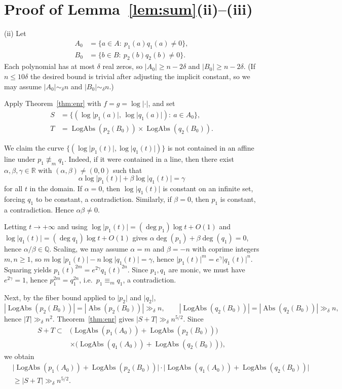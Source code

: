 \documentclass[12pt,reqno]{amsart}
\numberwithin{equation}{section}
\newcommand{\abs}[1]{\lvert#1\rvert}
\DeclareMathOperator{\Absset}{Abs}
\DeclareMathOperator{\LogAbsset}{LogAbs}
\begin{document}
\appendix
\section{Proof of Lemma~\ref{lem:sum}(ii)--(iii)}\label{app:sumproof}

\medskip
\noindent (ii)
Let
\[
\begin{aligned}
A_0&=\{a\in A:\ p_1(a)q_1(a)\neq 0\},\\
B_0&=\{b\in B:\ p_2(b)q_2(b)\neq 0\}.
\end{aligned}
\]
Each polynomial has at most $\delta$ real zeros, so $|A_0|\ge n-2\delta$ and $|B_0|\ge n-2\delta$.
(If $n\le 10\delta$ the desired bound is trivial after adjusting the implicit constant,
so we may assume $|A_0|\sim_\delta n$ and $|B_0|\sim_\delta n$.)

Apply Theorem~\ref{thm:enr} with $f=g=\log\abs{\cdot}$, and set
\[
\begin{aligned}
S&=\{(\log\abs{p_1(a)},\,\log\abs{q_1(a)}):\ a\in A_0\},\\
T&=\LogAbsset(p_2(B_0))\times \LogAbsset(q_2(B_0)).
\end{aligned}
\]

We claim the curve $\{(\log\abs{p_1(t)},\log\abs{q_1(t)})\}$ is not contained in an affine line
under $p_1\not\equiv_m q_1$.
Indeed, if it were contained in a line, then there exist $\alpha,\beta,\gamma\in\mathbb R$ with
$(\alpha,\beta)\neq(0,0)$ such that
\[
\alpha\log\abs{p_1(t)}+\beta\log\abs{q_1(t)}=\gamma
\]
for all $t$ in the domain.
If $\alpha=0$, then $\log\abs{q_1(t)}$ is constant on an infinite set, forcing $q_1$ to be constant,
a contradiction. Similarly, if $\beta=0$, then $p_1$ is constant, a contradiction. Hence $\alpha\beta\neq 0$.

Letting $t\to+\infty$ and using
$\log\abs{p_1(t)}=(\deg p_1)\log t+O(1)$ and
$\log\abs{q_1(t)}=(\deg q_1)\log t+O(1)$ gives
$\alpha\deg(p_1)+\beta\deg(q_1)=0$, hence $\alpha/\beta\in\mathbb Q$.
Scaling, we may assume $\alpha=m$ and $\beta=-n$ with coprime integers $m,n\ge 1$, so
$m\log\abs{p_1(t)}-n\log\abs{q_1(t)}=\gamma$, hence
$\abs{p_1(t)}^m=e^\gamma \abs{q_1(t)}^n$.
Squaring yields $p_1(t)^{2m}=e^{2\gamma}q_1(t)^{2n}$.
Since $p_1,q_1$ are monic, we must have $e^{2\gamma}=1$, hence $p_1^{2m}=q_1^{2n}$,
i.e.\ $p_1\equiv_m q_1$, a contradiction.


Next, by the fiber bound applied to $\abs{p_2}$ and $\abs{q_2}$,
\[
|\LogAbsset(p_2(B_0))|
=|\Absset(p_2(B_0))|
\gg_\delta n,
\qquad
|\LogAbsset(q_2(B_0))|
=|\Absset(q_2(B_0))|
\gg_\delta n,
\]
hence $|T|\gg_\delta n^2$.
Theorem~\ref{thm:enr} gives $|S+T|\gg_\delta n^{5/2}$.
Since
\[
\begin{aligned}
S+T\subset {}&
\bigl(\LogAbsset(p_1(A_0))+\LogAbsset(p_2(B_0))\bigr)\\
&\times
\bigl(\LogAbsset(q_1(A_0))+\LogAbsset(q_2(B_0))\bigr),
\end{aligned}
\]
we obtain
\[
\begin{aligned}
&\bigl|\LogAbsset(p_1(A_0))+\LogAbsset(p_2(B_0))\bigr|\cdot
 \bigl|\LogAbsset(q_1(A_0))+\LogAbsset(q_2(B_0))\bigr|\\
&\ge |S+T|\gg_\delta n^{5/2}.
\end{aligned}
\]
\end{document}
